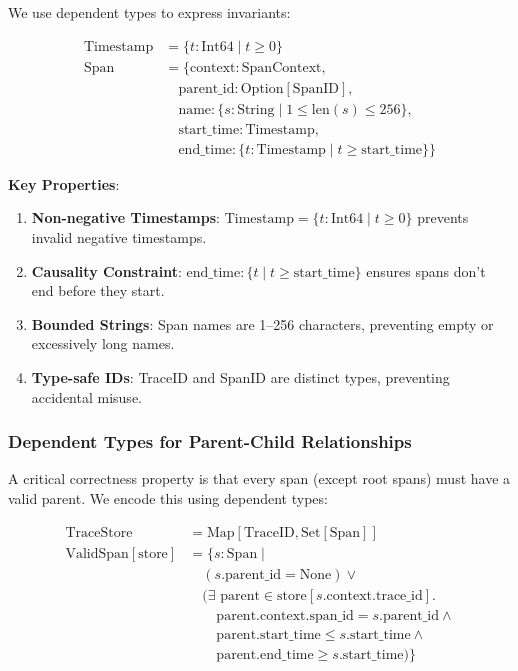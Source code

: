 We use dependent types to express invariants:

\begin{align*}
\text{Timestamp} &= \{t: \text{Int64} \mid t \geq 0\} \\
\text{Span} &= \{ \text{context}: \text{SpanContext}, \\
            &\quad \text{parent\_id}: \text{Option}[\text{SpanID}], \\
            &\quad \text{name}: \{s: \text{String} \mid 1 \leq \text{len}(s) \leq 256\}, \\
            &\quad \text{start\_time}: \text{Timestamp}, \\
            &\quad \text{end\_time}: \{t: \text{Timestamp} \mid t \geq \text{start\_time}\} \}
\end{align*}

\textbf{Key Properties}:

\begin{enumerate}
\item \textbf{Non-negative Timestamps}: $\text{Timestamp} = \{t: \text{Int64} \mid t \geq 0\}$ prevents invalid negative timestamps.

\item \textbf{Causality Constraint}: $\text{end\_time}: \{t \mid t \geq \text{start\_time}\}$ ensures spans don't end before they start.

\item \textbf{Bounded Strings}: Span names are 1--256 characters, preventing empty or excessively long names.

\item \textbf{Type-safe IDs}: TraceID and SpanID are distinct types, preventing accidental misuse.
\end{enumerate}

\subsubsection{Dependent Types for Parent-Child Relationships}

A critical correctness property is that every span (except root spans) must have a valid parent. We encode this using dependent types:

\begin{align*}
\text{TraceStore} &= \text{Map}[\text{TraceID}, \text{Set}[\text{Span}]] \\
\text{ValidSpan}[\text{store}] &= \{s: \text{Span} \mid \\
&\quad (s.\text{parent\_id} = \text{None}) \lor \\
&\quad (\exists \text{ parent} \in \text{store}[s.\text{context}.\text{trace\_id}]. \\
&\quad\quad \text{parent}.\text{context}.\text{span\_id} = s.\text{parent\_id} \land \\
&\quad\quad \text{parent}.\text{start\_time} \leq s.\text{start\_time} \land \\
&\quad\quad \text{parent}.\text{end\_time} \geq s.\text{start\_time}) \}
\end{align*}

